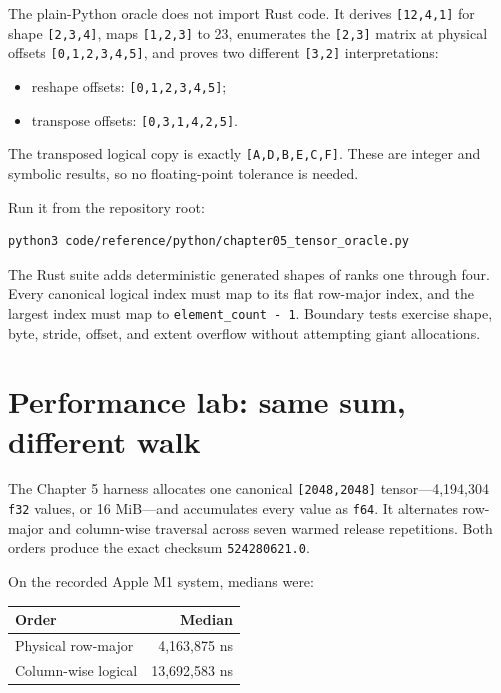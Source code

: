 The plain-Python oracle does not import Rust code. It derives
\texttt{{[}12,4,1{]}} for shape \texttt{{[}2,3,4{]}}, maps
\texttt{{[}1,2,3{]}} to 23, enumerates the \texttt{{[}2,3{]}} matrix at
physical offsets \texttt{{[}0,1,2,3,4,5{]}}, and proves two different
\texttt{{[}3,2{]}} interpretations:

\begin{itemize}
\tightlist
\item
  reshape offsets: \texttt{{[}0,1,2,3,4,5{]}};
\item
  transpose offsets: \texttt{{[}0,3,1,4,2,5{]}}.
\end{itemize}

The transposed logical copy is exactly \texttt{{[}A,D,B,E,C,F{]}}. These
are integer and symbolic results, so no floating-point tolerance is
needed.

Run it from the repository root:

\begin{verbatim}
python3 code/reference/python/chapter05_tensor_oracle.py
\end{verbatim}

The Rust suite adds deterministic generated shapes of ranks one through
four. Every canonical logical index must map to its flat row-major
index, and the largest index must map to \texttt{element\_count\ -\ 1}.
Boundary tests exercise shape, byte, stride, offset, and extent overflow
without attempting giant allocations.

\section{Performance lab: same sum, different
walk}\label{performance-lab-same-sum-different-walk}

The Chapter 5 harness allocates one canonical \texttt{{[}2048,2048{]}}
tensor---4,194,304 \texttt{f32} values, or 16 MiB---and accumulates
every value as \texttt{f64}. It alternates row-major and column-wise
traversal across seven warmed release repetitions. Both orders produce
the exact checksum \texttt{524280621.0}.

On the recorded Apple M1 system, medians were:

{\def\LTcaptype{none} %
\begin{longtable}[]{@{}lr@{}}
\toprule\noalign{}
Order & Median \\
\midrule\noalign{}
\endhead
\bottomrule\noalign{}
\endlastfoot
Physical row-major & 4,163,875 ns \\
Column-wise logical & 13,692,583 ns \\
\end{longtable}
}

